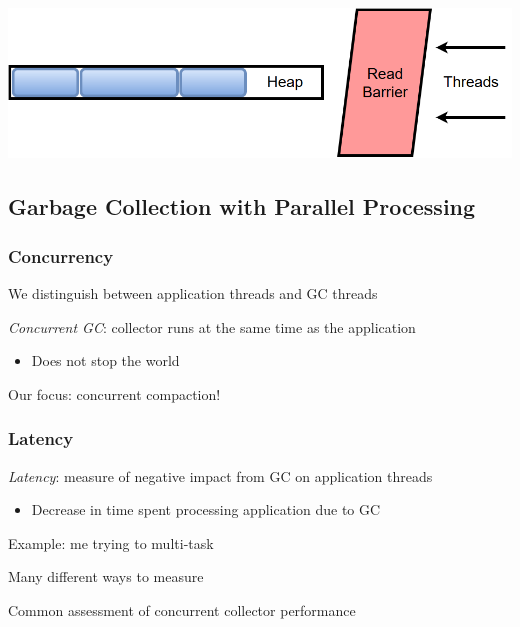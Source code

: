 \documentclass{beamer}
\newcommand{\linespace}{\vskip 0.25cm}
\begin{document}
\begin{frame}
{\linespace
\linespace
\linespace

\begin{center}
\includegraphics[width=.70\textwidth]{Illustrations/read_barrier.png}
\end{center}

}

\end{frame}



\subsection[GC with PP]{Garbage Collection with Parallel Processing}

\begin{frame}

\frametitle{Concurrency}

We distinguish between application threads and GC threads

\linespace
\linespace

\emph{Concurrent GC}: collector runs at the same time as the application
\begin{itemize}
\item Does not stop the world
\end{itemize}

\linespace
\linespace

Our focus: concurrent compaction!

\end{frame}

\begin{frame}

\frametitle{Latency}

\emph{Latency}: measure of negative impact from GC on application threads
\begin{itemize}
\item Decrease in time spent processing application due to GC
\end{itemize}

\linespace
\linespace

Example: me trying to multi-task

\linespace
\linespace

Many different ways to measure

\linespace
\linespace

Common assessment of concurrent collector performance

\end{frame}
\end{document}
